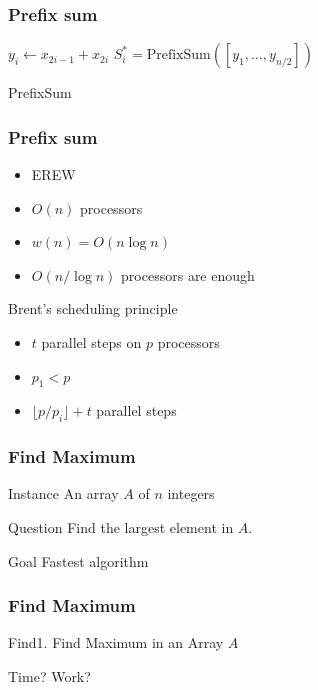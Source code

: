 \documentclass[14pt]{beamer}
\begin{document}
\begin{frame}\frametitle{Prefix sum}
\begin{algorithm}[H]

{
  $y_{i}\gets x_{2i-1} + x_{2i}$\;
}
$S^{*}_{i} = \text{PrefixSum}([y_{1}, \ldots , y_{n/2}])$\;
{
}
\caption{PrefixSum}
\end{algorithm}
\end{frame}


\begin{frame}\frametitle{Prefix sum}
  \begin{itemize}
  \item
    EREW
  \item
    $O(n)$ processors
  \item
    $w(n) = O(n\log n)$
  \item
    $O(n/\log n)$ processors are enough
  \end{itemize}

\begin{block}{Brent's scheduling principle}
  \begin{itemize}
  \item
    $t$ parallel steps on $p$ processors
  \item
    $p_{1}<p$
  \item
    $\lfloor p/p_{i}\rfloor +t$ parallel steps
  \end{itemize}
\end{block}
\end{frame}

\begin{frame}\frametitle{Find Maximum}
\begin{block}{Instance}
An array $A$ of $n$ integers
\end{block}
\begin{block}{Question}
Find the largest element in $A$.    
\end{block}
\begin{block}{Goal}
Fastest algorithm
\end{block}
\end{frame}

\begin{frame}\frametitle{Find Maximum}
\begin{algorithm}[H]
\caption{Find1.    
Find Maximum in an Array $A$}
\end{algorithm}
Time? Work? 
\end{frame}
\end{document}
